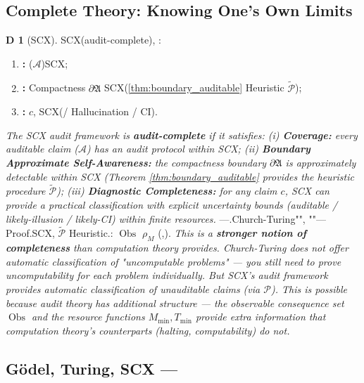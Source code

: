 \documentclass[12pt,a4paper]{article}
\theoremstyle{plain}
\theoremstyle{definition}
\newtheorem{definition}[theorem]Definition
\theoremstyle{remark}
\newcommand{\A}{\mathcal{A}}
\newcommand{\AuditBoundary}{\partial\mathfrak{A}}
\DeclareMathOperator{\ObsSet}{Obs}
\begin{document}
\subsection{Complete Theory: Knowing One's Own Limits}
\begin{definition}[SCX]\label{def:completeness}
SCX(audit-complete), : 
\begin{enumerate}[label=(\roman*)]
 \item \textbf{: } ($\A$)SCX; 
 \item \textbf{: } Compactness $\AuditBoundary$ SCX(\ref{thm:boundary_auditable} Heuristic $\widetilde{\mathcal{P}}$); 
 \item \textbf{: } $c$, SCX(/ Hallucination / CI).
\end{enumerate}
\end{definition}
\vspace{4pt}
\noindent
\textit{The SCX audit framework is \textbf{audit-complete} if it satisfies: (i) \textbf{Coverage:} every auditable claim ($\A$) has an audit protocol within SCX; (ii) \textbf{Boundary Approximate Self-Awareness:} the compactness boundary $\AuditBoundary$ is approximately detectable within SCX (Theorem \ref{thm:boundary_auditable} provides the heuristic procedure $\widetilde{\mathcal{P}}$); (iii) \textbf{Diagnostic Completeness:} for any claim $c$, SCX can provide a practical classification with explicit uncertainty bounds (auditable / likely-illusion / likely-CI) within finite resources.}
\vspace{6pt}
---.Church-Turing"", ""---Proof.SCX, $\widetilde{\mathcal{P}}$ Heuristic.: $\ObsSet$ $\rho_M$ (,).
\vspace{4pt}
\noindent
\textit{This is a \textbf{stronger notion of completeness} than computation theory provides. Church-Turing does not offer automatic classification of "uncomputable problems" --- you still need to prove uncomputability for each problem individually. But SCX's audit framework provides automatic classification of unauditable claims (via $\mathcal{P}$). This is possible because audit theory has additional structure --- the observable consequence set $\ObsSet$ and the resource functions $M_{\min}, T_{\min}$ provide extra information that computation theory's counterparts (halting, computability) do not.}
\subsection{G\"odel, Turing, SCX ---}
\end{document}
